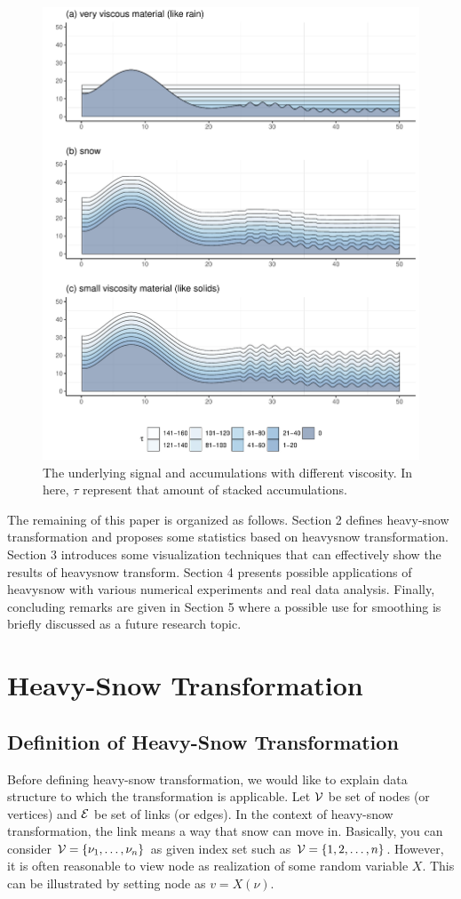 \documentclass[preprint, review, 12pt]{article}
\theoremstyle{definition}
\theoremstyle{remark}
\begin{document}
\begin{figure}
\centering
\includegraphics[width=1\textwidth]{Fig/Fig2.pdf}
\caption{The underlying signal and accumulations with different viscosity. In here, $\tau$ represent that amount of stacked accumulations.}
\end{figure}

The remaining of this paper is organized as follows. Section 2 defines heavy-snow transformation and proposes some statistics based on heavysnow transformation. 
Section 3 introduces some visualization techniques that can effectively show the results of heavysnow transform. Section 4 presents possible applications of heavysnow with various numerical experiments and real data analysis. Finally, concluding remarks are given in Section 5 where a possible use for smoothing is briefly discussed as a future research topic. 

\section{Heavy-Snow Transformation}
\subsection{Definition of Heavy-Snow Transformation}
Before defining heavy-snow transformation, we would like to explain data structure to which the transformation is applicable. 
Let ${\cal V}$ be set of nodes (or vertices) and ${\cal E}$ be set of links (or edges). In the context of heavy-snow transformation, the link means a way that snow can move in. Basically, you can consider ${\cal V}=\{\nu_1,\dots,\nu_n\}$ as given index set such as ${\cal V}=\{1,2,\dots,n\}$. However, it is often reasonable to view node as realization of some random variable $X$. This can be illustrated by setting node as $v=X(\nu)$. 
\end{document}
